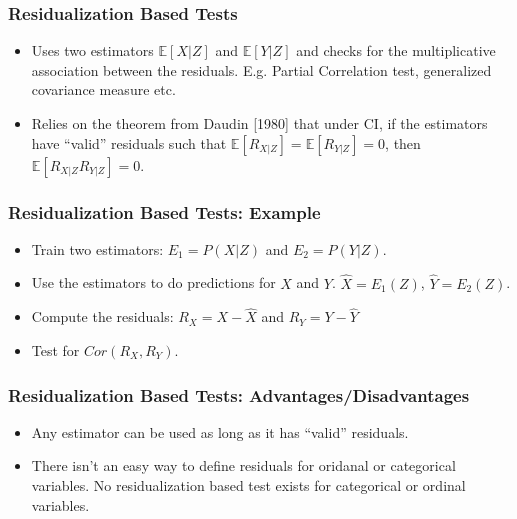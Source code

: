 \documentclass{beamer}
\begin{document}
\begin{frame}
	\frametitle{Residualization Based Tests}
	\begin{itemize}
		\setlength\itemsep{1em}
		\item Uses two estimators $ \mathbb{E}[X| Z] $ and $
			\mathbb{E}[Y | Z] $ and checks for the multiplicative
			association between the residuals. E.g.
			Partial Correlation test, generalized covariance measure etc.
		\item Relies on the theorem from Daudin [1980] \footnotemark 
			that under CI, if the estimators have ``valid'' residuals
			such that $ \mathbb{E}[R_{X|Z}] = \mathbb{E}[R_{Y|Z}] = 0 $,
			then $ \mathbb{E}[R_{X|Z} R_{Y|Z}] = 0 $.
	\end{itemize}
\end{frame}

\begin{frame}
	\frametitle{Residualization Based Tests: Example}
	\begin{itemize}
		\item Train two estimators: $ E_1 = P(X | Z) $ and $ E_2 = P(Y | Z ) $.
		\item Use the estimators to do predictions for $ X $ and $ Y $. $ \hat{X} = E_1(Z) $, $ \hat{Y} = E_2(Z) $.
		\item Compute the residuals: $ R_X = X - \hat{X} $ and $ R_Y = Y - \hat{Y} $
		\item Test for $ Cor(R_X, R_Y) $.
	\end{itemize}
\end{frame}

\begin{frame}
	\frametitle{Residualization Based Tests: Advantages/Disadvantages}
	\begin{itemize}
		\item Any estimator can be used as long as it has ``valid'' residuals.
		\item There isn't an easy way to define residuals for oridanal or categorical variables. No residualization based test exists for categorical or ordinal variables.
	\end{itemize}
\end{frame}
\end{document}
